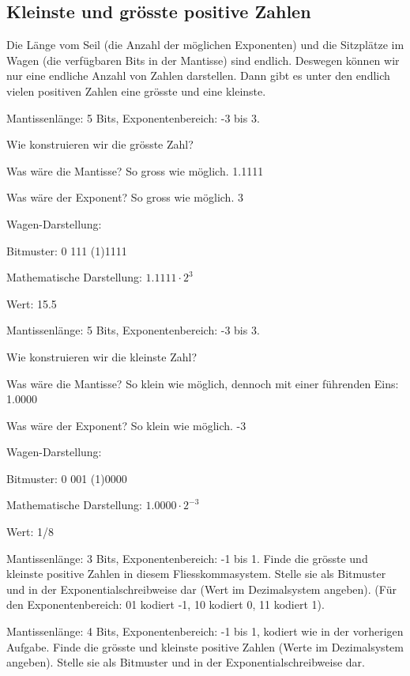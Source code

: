 \subsection{Kleinste und grösste positive Zahlen}

Die Länge vom Seil (die Anzahl der möglichen Exponenten) und die Sitzplätze im Wagen (die verfügbaren Bits in der Mantisse) sind endlich. Deswegen können wir nur eine endliche Anzahl von Zahlen darstellen. Dann gibt es unter den endlich vielen positiven Zahlen eine grösste und eine kleinste.

\begin{beispiel}
Mantissenlänge: 5 Bits, Exponentenbereich: -3 bis 3.

Wie konstruieren wir die grösste Zahl?

Was wäre die Mantisse? So gross wie möglich. 1.1111

Was wäre der Exponent? So gross wie möglich. 3

Wagen-Darstellung:

Bitmuster: 0 111 (1)1111

Mathematische Darstellung: \(1.1111 \cdot 2^3\)

Wert: 15.5

\end{beispiel}

\begin{beispiel}
Mantissenlänge: 5 Bits, Exponentenbereich: -3 bis 3.

Wie konstruieren wir die kleinste Zahl?

Was wäre die Mantisse? So klein wie möglich, dennoch mit einer führenden Eins: 1.0000

Was wäre der Exponent? So klein wie möglich. -3

Wagen-Darstellung:

Bitmuster: 0 001 (1)0000

Mathematische Darstellung: \(1.0000 \cdot 2^{-3}\)

Wert: 1/8
\end{beispiel}

\begin{aufgabe}
Mantissenlänge: 3 Bits, Exponentenbereich: -1 bis 1.
Finde die grösste und kleinste positive Zahlen in diesem Fliesskommasystem. Stelle sie als Bitmuster und in der Exponentialschreibweise dar (Wert im Dezimalsystem angeben).
(Für den Exponentenbereich: 01 kodiert -1, 10 kodiert 0, 11 kodiert 1).
\end{aufgabe}

\begin{aufgabe}
Mantissenlänge: 4 Bits, Exponentenbereich: -1 bis 1, kodiert wie in der vorherigen Aufgabe.
Finde die grösste und kleinste positive Zahlen (Werte im Dezimalsystem angeben). Stelle sie als Bitmuster und in der Exponentialschreibweise dar.
\end{aufgabe}

